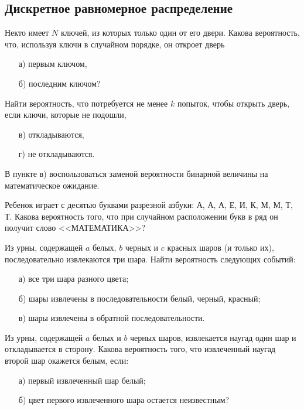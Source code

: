 \subsection{Дискретное равномерное распределение}


\begin{problem}
Некто имеет $N$ ключей, из которых только один от его двери. Какова вероятность, что, используя ключи в случайном порядке, 
он откроет дверь 
\begin{enumerate}
\item[а)] первым ключом, 
\item[б)] последним ключом? 
\end{enumerate}
Найти вероятность, что потребуется не менее $k$ попыток, чтобы открыть дверь, если ключи, которые не подошли, 
\begin{enumerate}
\item[в)] откладываются, 
\item[г)] не откладываются. 
\end{enumerate}

\begin{ordre}
В пункте в) воспользоваться заменой вероятности бинарной величины на математическое ожидание.
\end{ordre}

\end{problem}


\begin{problem}
Ребенок играет с десятью буквами разрезной азбуки: А, А, А, Е, И, К, М, М, Т, Т. 
Какова вероятность того, что при случайном расположении букв в ряд он получит слово <<МАТЕМАТИКА>>? 
\end{problem}


\begin{problem}
Из урны, содержащей $a$ белых, $b$ черных и $c$ красных шаров (и только их), последовательно извлекаются три шара. Найти 
вероятность следующих событий: 
\begin{enumerate}
\item[а)] все три шара разного цвета; 
\item[б)] шары извлечены в последовательности белый, черный, красный; 
\item[в)] шары извлечены в обратной последовательности. 
\end{enumerate}
\end{problem}



\begin{problem}
Из урны, содержащей $a$ белых и $b$ черных шаров, извлекается наугад один шар и откладывается в сторону. Какова вероятность 
того, что извлеченный наугад второй шар окажется белым, если: 
\begin{enumerate}
\item[а)] первый извлеченный шар белый; 
\item[б)] цвет  первого извлеченного шара остается неизвестным? 
\end{enumerate}
\end{problem}





